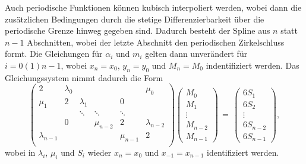 Auch periodische Funktionen können kubisch interpoliert werden, wobei
dann die zusätzlichen Bedingungen durch die stetige
Differenzierbarkeit über die periodische Grenze hinweg gegeben
sind. Dadurch besteht der Spline aus $n$ statt $n-1$ Abschnitten,
wobei der letzte Abschnitt den periodischen Zirkelschluss formt. Die
Gleichungen für $\alpha_i$ und $m_i$ gelten dann unverändert für
$i=0(1)n-1$, wobei $x_n = x_0$, $y_n = y_0$ und $M_n = M_0$
indentifiziert werden. Das Gleichungssystem nimmt dadurch die Form
\begin{equation}
  \label{eq:spline2}
  \begin{pmatrix}
    2      & \lambda_0 &           &           &           &      \mu_0 \\
    \mu_1  & 2         & \lambda_1 &           & 0\\
           &           & \ddots    & \ddots    & \ddots \\
           & 0          &           & \mu_{n-2}  & 2         & \lambda_{n-2} \\
    \lambda_{n-1} &           &           &           & \mu_{n-1}  & 2         \\
  \end{pmatrix}
  \begin{pmatrix}
    M_0\\
    M_1\\
    \vdots\\
    M_{n-2}\\
    M_{n-1}
  \end{pmatrix} \,=\,
  \begin{pmatrix}
    6S_1\\
    6S_2\\
    \vdots\\
    6S_{n-2} \\
    6S_{n-1}
  \end{pmatrix},
\end{equation}
wobei in $\lambda_i$, $\mu_i$ und $S_i$ wieder $x_{n} = x_0$
und $x_{-1} = x_{n-1}$ identifiziert werden.

